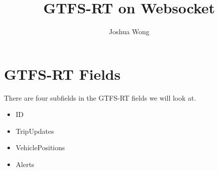 \documentclass[a4paper,10pt]{article}
\title{GTFS-RT on Websocket}
\author{Joshua Wong}
\begin{document}
\maketitle

\begin{abstract}

\end{abstract}

\section{GTFS-RT Fields}
There are four subfields in the GTFS-RT fields we will look at.
\begin{itemize}
    \item ID
    \item TripUpdates
    \item VehiclePositions
    \item Alerts
\end{itemize}
\end{document}
